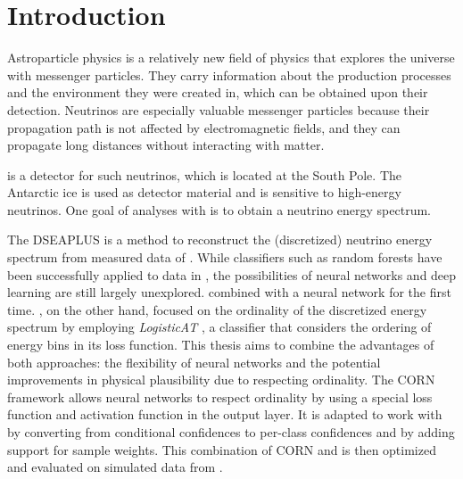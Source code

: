 \chapter{Introduction}
Astroparticle physics is a relatively new field of physics
  that explores the universe
    with messenger particles.
They carry information about
    the production processes
    and the environment they were created in,
  which can be obtained upon their detection.
Neutrinos are especially valuable messenger particles
  because their propagation path is not affected by electromagnetic fields,
  and they can propagate long distances without interacting with matter.


\icecube{} is a detector for such neutrinos,
  which is located at the South Pole.
The Antarctic ice is used as detector material
  and is sensitive to high-energy neutrinos. %
One goal of analyses with \icecube{} is
  to obtain a neutrino energy spectrum.

The \acf{DSEAPLUS} \cite{dsea_unification}
is a method to reconstruct the (discretized) neutrino energy spectrum
  from measured data of \icecube{}.
While classifiers such as random forests
have been successfully applied to \icecube{} data in \dsea{} \cite{hymon2021seasonal},
the possibilities of neural networks and deep learning are still largely unexplored. %
%
\citeauthor{dsea_samuel} \cite{dsea_samuel}
combined \dsea{} with a neural network for the first time.
%
\citeauthor{dsea_jan} \cite{dsea_jan},
  on the other hand,
focused on the ordinality of the discretized energy spectrum
  by employing \emph{LogisticAT} \cite{logisticat},
    a classifier
      that considers
        the ordering of energy bins
      in its loss function.
%
This thesis aims to combine the advantages of both approaches:
  the flexibility of neural networks
  and the potential improvements in physical plausibility
    due to respecting ordinality.
The \acf{CORN} framework \cite{corn}
  allows neural networks to respect ordinality
  by using a special
    loss function
    and activation function
      in the output layer.
It is adapted to work with \dsea{}
  by converting from conditional confidences to per-class confidences
  and by adding support for sample weights.
This combination of \acf{CORN} and \dsea{}
is then optimized and evaluated
  on simulated data from \icecube{}.

